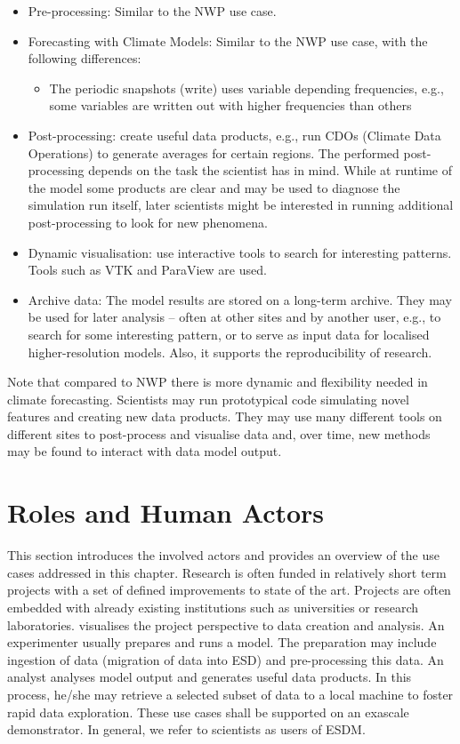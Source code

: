 \begin{itemize}
	\item Pre-processing: Similar to the NWP use case.
	\item Forecasting with Climate Models: Similar to the NWP use case, with the following differences:
	\begin{itemize}
		\item The periodic snapshots (write) uses variable depending frequencies, e.g., some variables are written out with higher frequencies than others
	\end{itemize}
	\item Post-processing: create useful data products, e.g., run CDOs (Climate Data Operations) to generate averages for certain regions. The performed post-processing depends on the task the scientist has in mind. While at runtime of the model some products are clear and may be used to diagnose the simulation run itself, later scientists might be interested in running additional post-processing to look for new phenomena.
	\item Dynamic visualisation: use interactive tools to search for interesting patterns. Tools such as VTK and ParaView are used. %
	\item Archive data: The model results are stored on a long-term archive. They may be used for later analysis --  often at other sites and by another user, e.g., to search for some interesting pattern, or to serve as input data for localised higher-resolution models. Also, it supports the reproducibility of research.
\end{itemize}

Note that compared to NWP there is more dynamic and flexibility needed in climate forecasting.
Scientists may run prototypical code simulating novel features and creating new data products.
They may use many different tools on different sites to post-process and visualise data and, over time, new methods may be found to interact with data model output.

\section{Roles and Human Actors}
\label{sec:use cases/actors}

This section introduces the involved actors and provides an overview of the use cases addressed in this chapter.
Research is often funded in relatively short term projects with a set of defined improvements to state of the art.
Projects are often embedded with already existing institutions such as universities or research laboratories.
 visualises the project perspective to data creation and analysis.
An experimenter usually prepares and runs a model. The preparation may include ingestion of data (migration of data into ESD) and pre-processing this data.
An analyst analyses model output and generates useful data products.
In this process, he/she may retrieve a selected subset of data to a local machine to foster rapid data exploration.
These use cases shall be supported on an exascale demonstrator.
In general, we refer to scientists as users of ESDM.



